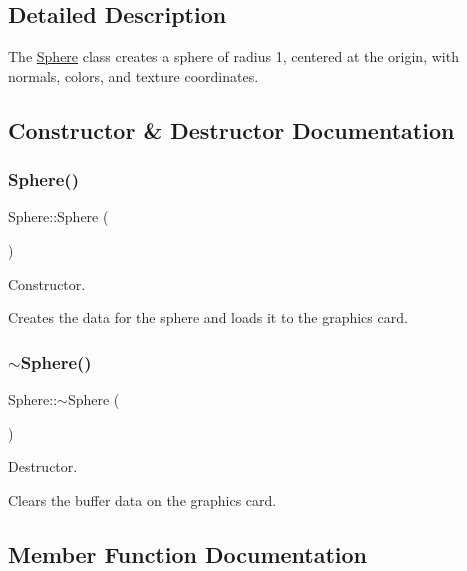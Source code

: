 \subsection{Detailed Description}
The \hyperlink{class_sphere}{Sphere} class creates a sphere of radius 1, centered at the origin, with normals, colors, and texture coordinates. 

\subsection{Constructor \& Destructor Documentation}
\mbox{\label{class_sphere_a890a63ff583cb88e7ec4e840b4ef5eb9}} 
\subsubsection{\texorpdfstring{Sphere()}{Sphere()}}
{\footnotesize\ttfamily Sphere\+::\+Sphere (\begin{DoxyParamCaption}{ }\end{DoxyParamCaption})}



Constructor. 

Creates the data for the sphere and loads it to the graphics card. \mbox{\label{class_sphere_a569c071e50a3e11f678630ee1a17737e}} 
\subsubsection{\texorpdfstring{$\sim$\+Sphere()}{~Sphere()}}
{\footnotesize\ttfamily Sphere\+::$\sim$\+Sphere (\begin{DoxyParamCaption}{ }\end{DoxyParamCaption})}



Destructor. 

Clears the buffer data on the graphics card. 

\subsection{Member Function Documentation}
\mbox{\label{class_sphere_ae7781b43596bd0d45e0effa6c039c8af}} 
